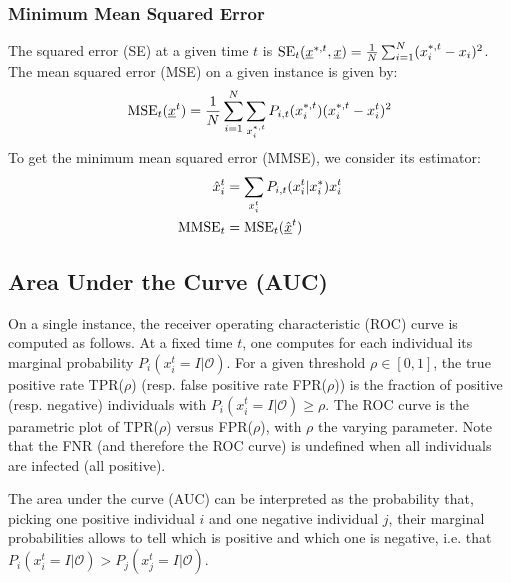 \documentclass[a4paper, amsfonts, amssymb, amsmath, reprint, showkeys, nofootinbib, twoside, floatfix, pre,superscriptaddress, onecolumn]{revtex4-2}
\begin{document}
\subsubsection{Minimum Mean Squared Error}
The squared error (SE) at a given time $t$ is ${\rm SE}_t(\underline{x}^{*,t},\underline{x}) = \frac{1}{N}\sum_{i=1}^N(x_i^{*,t}-x_i)^2$. The mean squared error (MSE) on a given instance is given by:
\begin{align}
	{\rm MSE}_t(\underline{x}^t) = \frac{1}{N}\sum_{i=1}^N\sum_{x_i^{*,t}}P_{i,t}(x_i^{*,t})(x_i^{*,t}-x_i^t)^2
\end{align}
To get the minimum mean squared error (MMSE), we consider its estimator:
\begin{align}
\begin{aligned}
	\hat{x}_i^t &= \sum_{x_i^t}P_{i,t}(x_i^t|x_i^*)x_i^t \\
	{\rm MMSE}_t &= {\rm MSE}_t(\underline{\hat{x}}^t)
\end{aligned}
\end{align}

\subsection{Area Under the Curve (AUC)}

On a single instance, the receiver operating characteristic (ROC) curve is computed as follows. At a fixed time $t$, one computes for each individual its marginal probability $P_i(x_i^t=I|\mathcal{O})$. For a given threshold $\rho\in[0,1]$, the true positive rate TPR($\rho$) (resp. false positive rate FPR($\rho$)) is the fraction of positive (resp. negative) individuals with $P_i(x_i^t=I|\mathcal{O})\geq \rho$. The ROC curve is the parametric plot of TPR($\rho$) versus FPR($\rho$), with $\rho$ the varying parameter. Note that the FNR (and therefore the ROC curve) is undefined when all individuals are infected (all positive).

The area under the curve (AUC) can be interpreted as the probability that, picking one positive individual $i$ and one negative individual $j$, their marginal probabilities allows to tell which is positive and which one is negative, i.e. that $P_i(x_i^t=I|\mathcal{O}) > P_j(x_j^t=I|\mathcal{O})$.


\end{document}
